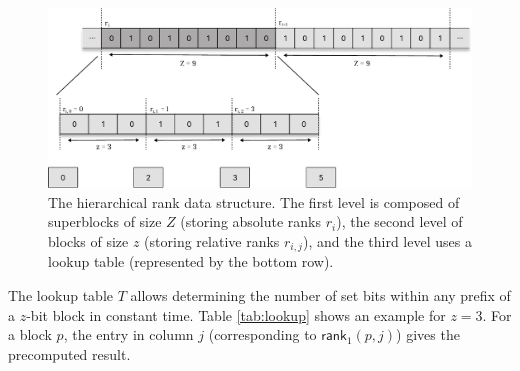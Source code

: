 \begin{figure}[hbtp]


    \includegraphics[width=\textwidth]{assets/rank.pdf}
    \caption{The hierarchical \textsf{rank} data structure. The first level is composed of superblocks of size $Z$ (storing absolute ranks $r_i$), the second level of blocks of size $z$ (storing relative ranks $r_{i,j}$), and the third level uses a lookup table (represented by the bottom row).} \label{fig:RRR}
\end{figure}


The lookup table $T$ allows determining the number of set bits within any prefix of a $z$-bit block in constant time. Table \ref{tab:lookup} shows an example for $z=3$. For a block $p$, the entry in column $j$ (corresponding to $\textsf{rank}_1(p, j)$) gives the precomputed result.

